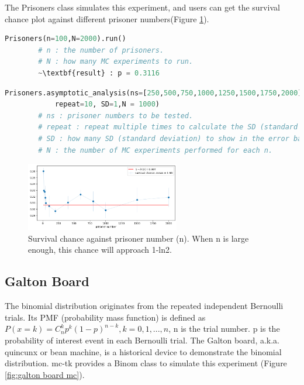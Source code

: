 \documentclass[11pt, letterpaper]{article}
\begin{document}
The Prisoners class simulates this experiment, and users can get the survival chance plot against different prisoner
numbers(Figure \ref{fig:locker2}).

\lstset{
    basicstyle=\footnotesize,
    xleftmargin=-3em,aboveskip=0.5em,belowskip=0.5em,
    escapeinside=~~,
}
\begin{lstlisting}[language=python]
        Prisoners(n=100,N=2000).run()
        # n : the number of prisoners.
        # N : how many MC experiments to run.
        ~\textbf{result} : p = 0.3116
    \end{lstlisting}

\lstset{
    basicstyle=\footnotesize,
    xleftmargin=-3em,aboveskip=0em,belowskip=0.5em
}
\begin{lstlisting}[language=python]    
        Prisoners.asymptotic_analysis(ns=[250,500,750,1000,1250,1500,1750,2000],
            repeat=10, SD=1,N = 1000)
        # ns : prisoner numbers to be tested.
        # repeat : repeat multiple times to calculate the SD (standard deviation).
        # SD : how many SD (standard deviation) to show in the error bar chart.
        # N : the number of MC experiments performed for each n.
    \end{lstlisting}

\begin{figure}[htbp]
    \centering
    \includegraphics[width=0.6\textwidth]{fig1-locker2.png}
    \caption{Survival chance against prisoner number (n). When n is large enough, this chance will approach 1-ln2.}
    \label{fig:locker2}
\end{figure}

\subsection{Galton Board}
The binomial distribution originates from the repeated independent Bernoulli trials.
Its PMF (probability mass function) is defined as $P(x=k)=C_{n}^{k}p^{k}(1-p)^{n-k},k=0,1,...,n$,
n is the trial number. p is the probability of interest event in each Bernoulli trial.
The Galton board, a.k.a. quincunx or bean machine, is a historical device to demonstrate
the binomial distribution. mc-tk provides a Binom class to simulate this experiment (Figure \ref{fig:galton board mc}).
\end{document}

